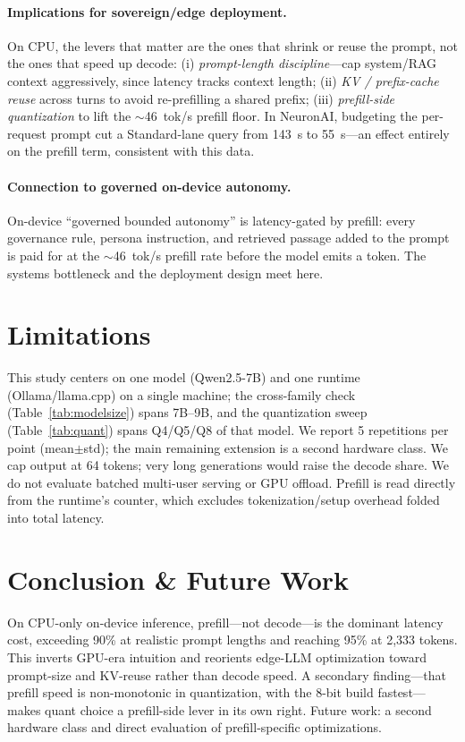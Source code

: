 \documentclass[10pt,twocolumn]{article}
\begin{document}
\paragraph{Implications for sovereign/edge deployment.}
On CPU, the levers that matter are the ones that shrink or reuse the
prompt, not the ones that speed up decode: (i) \emph{prompt-length
discipline}---cap system/RAG context aggressively, since latency tracks
context length; (ii) \emph{KV / prefix-cache reuse} across turns to avoid
re-prefilling a shared prefix; (iii) \emph{prefill-side quantization} to
lift the $\sim$46~tok/s prefill floor. In NeuronAI, budgeting the
per-request prompt cut a Standard-lane query from 143~s to 55~s---an effect
entirely on the prefill term, consistent with this data.

\paragraph{Connection to governed on-device autonomy.}
On-device ``governed bounded autonomy'' is latency-gated by prefill: every
governance rule, persona instruction, and retrieved passage added to the
prompt is paid for at the $\sim$46~tok/s prefill rate before the model
emits a token. The systems bottleneck and the deployment design meet here.

\section{Limitations}
\label{sec:limitations}
This study centers on one model (Qwen2.5-7B) and one runtime
(Ollama/llama.cpp) on a single machine; the cross-family check
(Table~\ref{tab:modelsize}) spans 7B--9B, and the quantization sweep
(Table~\ref{tab:quant}) spans Q4/Q5/Q8 of that model. We report 5
repetitions per point (mean$\pm$std); the main remaining extension is a
second hardware class. We cap
output at 64 tokens; very long generations would
raise the decode share. We do not evaluate batched multi-user serving or
GPU offload. Prefill is read directly from the runtime's counter, which
excludes tokenization/setup overhead folded into total latency.

\section{Conclusion \& Future Work}
\label{sec:conclusion}
On CPU-only on-device inference, prefill---not decode---is the dominant
latency cost, exceeding 90\% at realistic prompt lengths and reaching 95\%
at 2{,}333 tokens. This inverts GPU-era intuition and reorients edge-LLM
optimization toward prompt-size and KV-reuse rather than decode speed. A
secondary finding---that prefill speed is non-monotonic in quantization,
with the 8-bit build fastest---makes quant choice a prefill-side lever in
its own right. Future work: a second hardware class and direct evaluation
of prefill-specific optimizations.
\end{document}
